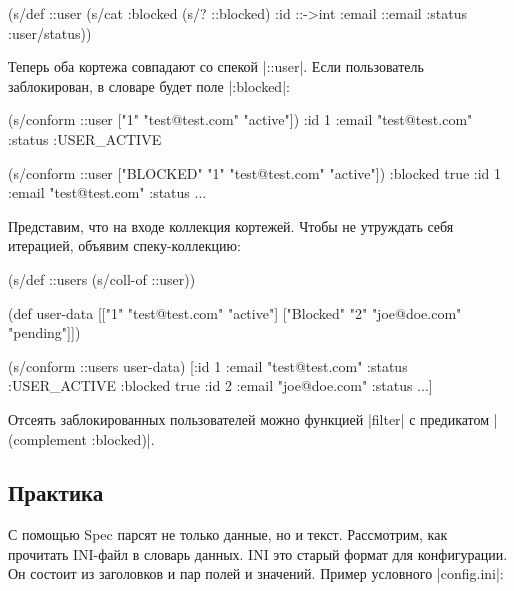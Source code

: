 \begin{english}
  \begin{clojure}
(s/def ::user
  (s/cat :blocked (s/? ::blocked)
         :id ::->int
         :email ::email
         :status :user/status))
  \end{clojure}
\end{english}

Теперь оба кортежа совпадают со спекой \spverb|::user|. Если пользователь
заблокирован, в словаре будет поле \spverb|:blocked|:

\begin{english}
  \begin{clojure}
(s/conform ::user ["1" "test@test.com" "active"])
{:id 1 :email "test@test.com" :status :USER_ACTIVE}

(s/conform ::user ["BLOCKED" "1" "test@test.com" "active"])
{:blocked true :id 1 :email "test@test.com" :status ...}
  \end{clojure}
\end{english}

Представим, что на входе коллекция кортежей. Чтобы не утруждать себя итерацией,
объявим спеку-коллекцию:

\begin{english}
  \begin{clojure}
(s/def ::users (s/coll-of ::user))

(def user-data
  [["1" "test@test.com" "active"]
   ["Blocked" "2" "joe@doe.com" "pending"]])

(s/conform ::users user-data)
[{:id 1 :email "test@test.com" :status :USER_ACTIVE}
 {:blocked true :id 2 :email "joe@doe.com" :status ...}]
  \end{clojure}
\end{english}


Отсеять заблокированных пользователей можно функцией \spverb|filter| с
предикатом \spverb|(complement :blocked)|.

\subsection{Практика}


С помощью Spec парсят не только данные, но и текст. Рассмотрим, как прочитать
INI-файл в словарь данных. INI
это старый формат для конфигурации. Он состоит из заголовков и пар полей и
значений. Пример условного \spverb|config.ini|:

